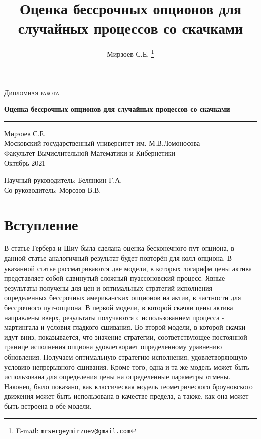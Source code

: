\documentclass[a4paper,12pt]{article}
\author{Мирзоев С.Е.%
\thanks{E-mail: \texttt{mrsergeymirzoev@gmail.com}}}
\title{Оценка бессрочных опционов для случайных процессов со скачками}
\affil{Факультет Вычислительной Математики и Кибернетики, Московский государственный университет им. М.В.Ломоносова}
\theoremstyle{definition}
\begin{document}
\begin{titlepage}
\centering

\textsc{Дипломная работа}


{\LARGE\bfseries Оценка бессрочных опционов для случайных процессов со скачками\\}
\rule{3in}{0.4pt}


Мирзоев С.Е.\\
Московский государственный университет им. М.В.Ломоносова\\
Факультет Вычислительной Математики и Кибернетики\\
Октябрь 2021


{\small
Научный руководитель: Белянкин Г.А.\\
Со-руководитель: Морозов В.В.}


\end{titlepage}
\thispagestyle{empty}

\newpage
\tableofcontents

\newpage

\section{Вступление}

В статье Гербера и Шиу была сделана оценка бесконечного пут-опциона, в данной статье аналогичный результат будет повторён для колл-опциона. В указанной статье рассматриваются две модели, в которых логарифм цены актива представляет собой сдвинутый сложный пуассоновский процесс. Явные результаты получены для цен и оптимальных стратегий исполнения определенных бессрочных американских опционов на актив, в частности для бессрочного пут-опциона. В первой модели, в которой скачки цены актива направлены вверх, результаты получаются с использованием процесса - мартингала и условия гладкого сшивания. Во второй модели, в которой скачки идут вниз, показывается, что значение стратегии, соответствующее постоянной границе исполнения опциона удовлетворяет определенному уравнению обновления. Получаем оптимальную стратегию исполнения, удовлетворяющую условию непрерывного сшивания. Кроме того, одна и та же модель может быть использована для определения цены на определенные параметры отмены. Наконец, было показано, как классическая модель геометрического броуновского движения может быть использована в качестве предела, а также, как она может быть встроена в обе модели.
\end{document}
